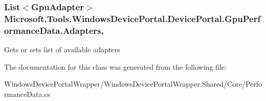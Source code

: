 \subsubsection[{\texorpdfstring{Adapters}{Adapters}}]{\setlength{\rightskip}{0pt plus 5cm}List$<${\bf Gpu\+Adapter}$>$ Microsoft.\+Tools.\+Windows\+Device\+Portal.\+Device\+Portal.\+Gpu\+Performance\+Data.\+Adapters\hspace{0.3cm}{\ttfamily [get]}, {\ttfamily [set]}}\hypertarget{class_microsoft_1_1_tools_1_1_windows_device_portal_1_1_device_portal_1_1_gpu_performance_data_afd66b159f115e90f211611a4784a252a}{}\label{class_microsoft_1_1_tools_1_1_windows_device_portal_1_1_device_portal_1_1_gpu_performance_data_afd66b159f115e90f211611a4784a252a}


Gets or sets list of available adapters 



The documentation for this class was generated from the following file\+:\begin{DoxyCompactItemize}
\item 
Windows\+Device\+Portal\+Wrapper/\+Windows\+Device\+Portal\+Wrapper.\+Shared/\+Core/Performance\+Data.\+cs\end{DoxyCompactItemize}
